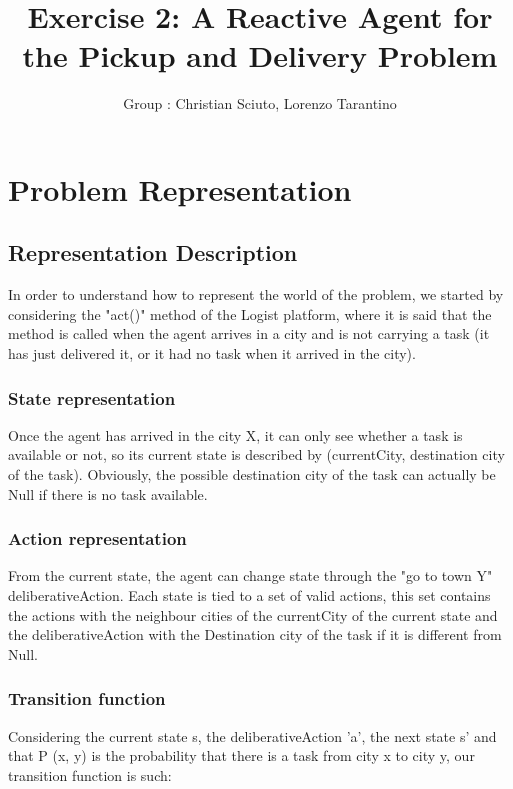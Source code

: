 \documentclass[11pt]{article}
\title{\bf Exercise 2: A Reactive Agent for the Pickup and Delivery Problem}
\author{Group \textnumero 15: Christian Sciuto, Lorenzo Tarantino}
\begin{document}
\maketitle

\section{Problem Representation}

\subsection{Representation Description}
In order to understand how to represent the world of the problem, we started by considering the "act()" method of the Logist platform, where it is said that the method is called when the agent arrives in a city and is not carrying a task (it has just delivered it, or it had no task when it arrived in the city).

\subsubsection{State representation}
Once the agent has arrived in the city X, it can only see whether a task is available or not, so its current state is described by (currentCity, destination city of the task). Obviously, the possible destination city of the task can actually be Null if there is no task available.

\subsubsection{Action representation}
From the current state, the agent can change state through the "go to town Y" deliberativeAction. Each state is tied to a set of valid actions, this set contains the actions with the neighbour cities of the currentCity of the current state and the deliberativeAction with the Destination city of the task if it is different from Null.

\subsubsection{Transition function}
Considering the current state s, the deliberativeAction 'a', the next state s' and that P (x, y) is the probability that there is a task from city x to city y, our transition function is such:
\end{document}
